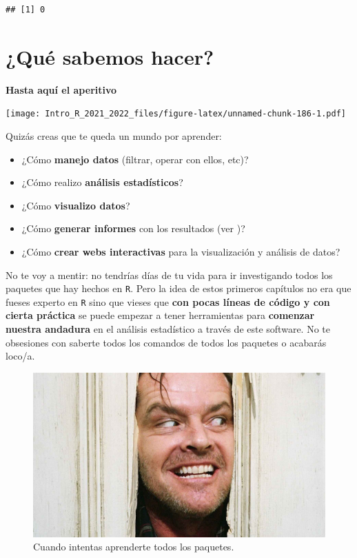 \documentclass[11pt,]{book}
\providecommand{\tightlist}{%
  \setlength{\itemsep}{0pt}\setlength{\parskip}{0pt}}
\begin{document}
\begin{verbatim}
## [1] 0
\end{verbatim}

\hypertarget{quuxe9-sabemos-hacer}{%
\chapter{¿Qué sabemos hacer?}\label{quuxe9-sabemos-hacer}}

\textbf{Hasta aquí el aperitivo}

\texttt{[image: Intro\_R\_2021\_2022\_files/figure-latex/unnamed-chunk-186-1.pdf]}

Quizás creas que te queda un mundo por aprender:

\begin{itemize}
\tightlist
\item
  ¿Cómo \textbf{manejo datos} (filtrar, operar con ellos, etc)?
\item
  ¿Cómo realizo \textbf{análisis estadísticos}?
\item
  ¿Cómo \textbf{visualizo datos}?
\item
  ¿Cómo \textbf{generar informes} con los resultados (ver \citep{xie2015})?
\item
  ¿Cómo \textbf{crear webs interactivas} para la visualización y análisis de datos?
\end{itemize}

No te voy a mentir: no tendrías días de tu vida para ir investigando todos los paquetes que hay hechos en \texttt{R}. Pero la idea de estos primeros capítulos no era que fueses experto en \texttt{R} sino que vieses que \textbf{con pocas líneas de código y con cierta práctica} se puede empezar a tener herramientas para \textbf{comenzar nuestra andadura} en el análisis estadístico a través de este software. No te obsesiones con saberte todos los comandos de todos los paquetes o acabarás loco/a.

\begin{figure}

{\centering \includegraphics[width=0.5\linewidth]{./img/stanley_kubrick} 

}

\caption{Cuando intentas aprenderte todos los paquetes.}\label{fig:unnamed-chunk-187}
\end{figure}
\end{document}
